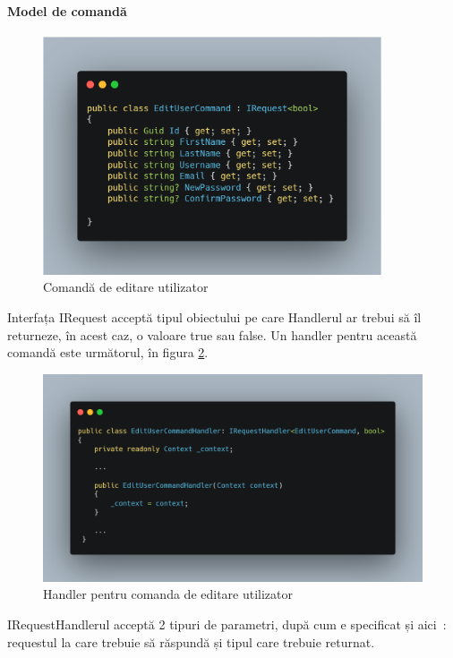 \paragraph{Model de comandă}
\begin{figure}[H]
	\centering
	\includegraphics[width=100mm]{figs/editUserCommand.png}
	\caption{Comandă de editare utilizator}
	\label{fig:editUserCommand}
\end{figure}
Interfața IRequest acceptă tipul obiectului pe care Handlerul ar trebui să îl returneze, în acest caz, o valoare true sau false.
Un handler pentru această comandă este următorul, în figura \ref{fig:editUserCommandHandler}.
\begin{figure}[H]
	\centering
	\includegraphics[width=150mm]{figs/editUserCommandHandler.png}
	\caption{Handler pentru comanda de editare utilizator}
	\label{fig:editUserCommandHandler}
\end{figure}
IRequestHandlerul acceptă 2 tipuri de parametri, după cum e specificat și aici~\cite{IRequestHandler}: requestul la care trebuie să răspundă și tipul care trebuie returnat.
